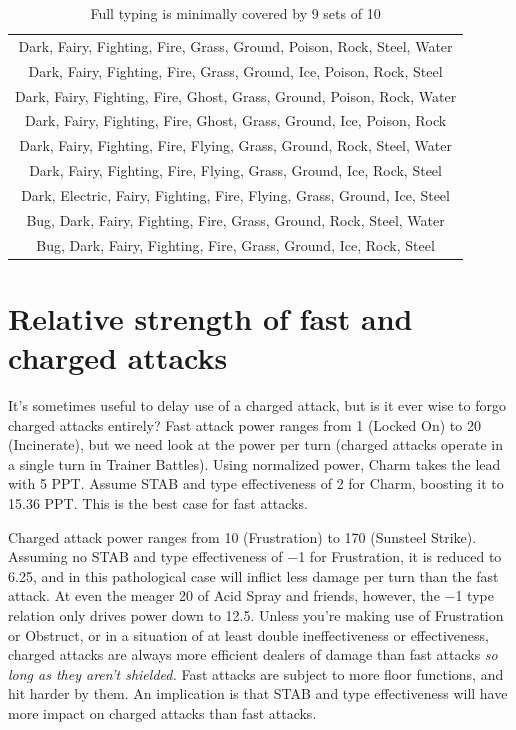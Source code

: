 \begin{table}
  \centering
  \begin{tabular}{c}
 Dark, Fairy, Fighting, Fire, Grass, Ground, Poison, Rock, Steel, Water\\
 Dark, Fairy, Fighting, Fire, Grass, Ground, Ice, Poison, Rock, Steel\\
 Dark, Fairy, Fighting, Fire, Ghost, Grass, Ground, Poison, Rock, Water\\
 Dark, Fairy, Fighting, Fire, Ghost, Grass, Ground, Ice, Poison, Rock\\
 Dark, Fairy, Fighting, Fire, Flying, Grass, Ground, Rock, Steel, Water\\
 Dark, Fairy, Fighting, Fire, Flying, Grass, Ground, Ice, Rock, Steel\\
 Dark, Electric, Fairy, Fighting, Fire, Flying, Grass, Ground, Ice, Steel\\
 Bug, Dark, Fairy, Fighting, Fire, Grass, Ground, Rock, Steel, Water\\
 Bug, Dark, Fairy, Fighting, Fire, Grass, Ground, Ice, Rock, Steel\\
  \end{tabular}
  \caption{Full typing is minimally covered by 9 sets of 10\label{table:coversetsdual}}
\end{table}

\section{Relative strength of fast and charged attacks\label{sec:fastvcharged}}
It's sometimes useful to delay use of a charged attack, but is it ever wise to forgo
  charged attacks entirely?
Fast attack power ranges from 1 (Locked On) to 20 (Incinerate), but we need look at
  the power per turn (charged attacks operate in a single turn in Trainer Battles).
Using normalized power, Charm takes the lead with 5 PPT\@.
Assume STAB and type effectiveness of 2 for Charm, boosting it to 15.36 PPT\@.
This is the best case for fast attacks.

Charged attack power ranges from 10 (Frustration) to 170 (Sunsteel Strike).
Assuming no STAB and type effectiveness of −1 for Frustration, it is reduced to 6.25,
  and in this pathological case will inflict less damage per turn than the fast attack.
At even the meager 20 of Acid Spray and friends, however, the −1 type relation only
  drives power down to 12.5.
Unless you're making use of Frustration or Obstruct,
  or in a situation of at least double ineffectiveness or effectiveness,
  charged attacks are always more efficient dealers of damage than fast attacks \textit{so long
  as they aren't shielded.}
Fast attacks are subject to more floor functions, and hit harder by them.
An implication is that STAB and type effectiveness will have more impact on
 charged attacks than fast attacks.

